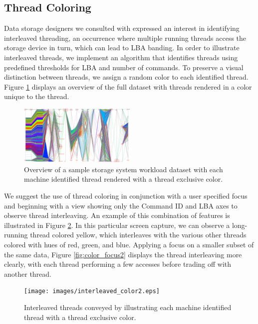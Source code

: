 \documentclass[journal]{vgtc}                %
\begin{document}
\subsection{Thread Coloring}
Data storage designers we consulted with expressed an interest in identifying interleaved threading, an occurrence where multiple running threads access the storage device in turn, which can lead to LBA banding. In order to illustrate interleaved threads, we implement an algorithm that identifies threads using predefined thresholds for LBA and number of commands. To preserve a visual distinction between threads, we assign a random color to each identified thread. Figure \ref{fig:color_overview} displays an overview of the full dataset with threads rendered in a color unique to the thread.

\begin{figure}[h!]
 \centering
 \includegraphics[width=0.5\textwidth]{images/color_overview.eps}
 \caption[Identified threads rendered with a thread exclusive color.]{Overview of a sample storage system workload dataset with each machine identified thread rendered with a thread exclusive color.}
 \label{fig:color_overview}
\end{figure}

We suggest the use of thread coloring in conjunction with a user specified focus and beginning with a view showing only the Command ID and LBA axes to observe thread interleaving. An example of this combination of features is illustrated in Figure \ref{fig:color_focus1}. In this particular screen capture, we can observe a long-running thread colored yellow, which interleaves with the various other threads colored with hues of red, green, and blue. Applying a focus on a smaller subset of the same data, Figure \ref{fig:color_focus2} displays the thread interleaving more clearly, with each thread performing a few accesses before trading off with another thread.

\begin{figure}[h!]
 \centering
 \texttt{[image: images/interleaved\_color2.eps]}
 \caption[Identified threads rendered with a thread exclusive color.]{Interleaved threads conveyed by illustrating each machine identified thread with a thread exclusive color.}
 \label{fig:color_focus1}
\end{figure}
\end{document}
